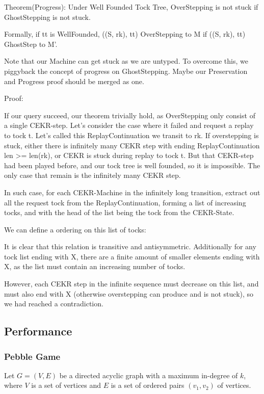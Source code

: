 Theorem(Progress): Under Well Founded Tock Tree, OverStepping is not stuck if GhostStepping is not stuck.

Formally, if tt is WellFounded, ((S, rk), tt) OverStepping to M if ((S, rk), tt) GhostStep to M'.

Note that our Machine can get stuck as we are untyped. To overcome this, we piggyback the concept of progress on GhostStepping. Maybe our Preservation and Progress proof should be merged as one.

Proof: 

If our query succeed, our theorem trivially hold, as OverStepping only consist of a single CEKR-step.
Let's consider the case where it failed and request a replay to tock t. Let's called this ReplayContinuation we transit to rk. If overstepping is stuck, either there is infinitely many CEKR step with ending ReplayContinuation len >= len(rk), or CEKR is stuck during replay to tock t. But that CEKR-step had been played before, and our tock tree is well founded, so it is impossible. The only case that remain is the infinitely many CEKR step.

In such case, for each CEKR-Machine in the infinitely long transition, extract out all the request tock from the ReplayContinuation, forming a list of increasing tocks, and with the head of the list being the tock from the CEKR-State.

We can define a ordering on this list of tocks:
It is clear that this relation is transitive and antisymmetric. Additionally for any tock list ending with X, there are a finite amount of smaller elements ending with X, as the list must contain an increasing number of tocks.

However, each CEKR step in the infinite sequence must decrease on this list, and must also end with X (otherwise overstepping can produce and is not stuck), so we had reached a contradiction.

\subsection{Performance}
\subsubsection{Pebble Game}
Let $G=(V,E)$ be a directed acyclic graph with a maximum in-degree of $k$, where $V$ is a set of vertices and $E$ is a set of ordered pairs $(v_1, v_2)$ of vertices.

